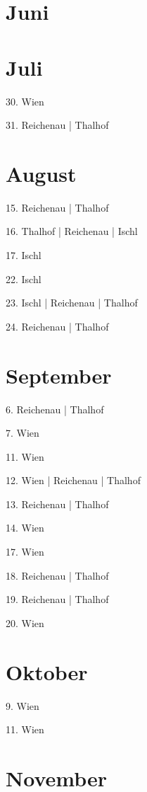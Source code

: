 \documentclass[twoside=false,titlepage=false,open=any, parskip=never, fontsize=10pt, headings=small, chapterprefix=false, appendixprefix=false, DIV=15]{scrbook}
\begin{document}
\begin{multicols}{3}
            \section*{Juni}
            \section*{Juli}
            30. Wien\par
            31. Reichenau | Thalhof\par
            \section*{August}
            15. Reichenau | Thalhof\par
            16. Thalhof | Reichenau | Ischl\par
            17. Ischl\par
            22. Ischl\par
            23. Ischl | Reichenau | Thalhof\par
            24. Reichenau | Thalhof\par
            \section*{September}
            6. Reichenau | Thalhof\par
            7. Wien\par
            11. Wien\par
            12. Wien | Reichenau | Thalhof\par
            13. Reichenau | Thalhof\par
            14. Wien\par
            17. Wien\par
            18. Reichenau | Thalhof\par
            19. Reichenau | Thalhof\par
            20. Wien\par
            \section*{Oktober}
            9. Wien\par
            11. Wien\par
            \section*{November}

\end{multicols}
\end{document}
